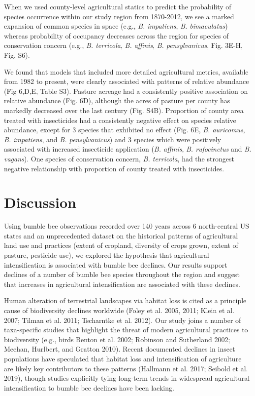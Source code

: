 \documentclass[11pt,]{article}
\begin{document}
When we used county-level agricultural statics to predict the
probability of species occurrence within our study region from
1870-2012, we see a marked expansion of common species in space (e.g.,
\emph{B. impatiens}, \emph{B. bimaculatus}) whereas probability of
occupancy decreases across the region for species of conservation
concern (e.g., \emph{B. terricola}, \emph{B. affinis}, \emph{B.
pensylvanicus}, Fig. 3E-H, Fig. S6).

We found that models that included more detailed agricultural metrics,
available from 1982 to present, were clearly associated with patterns of
relative abundance (Fig 6,D,E, Table S3). Pasture acreage had a
consistently positive association on relative abundance (Fig. 6D),
although the acres of pasture per county has markedly decreased over the
last century (Fig. S4B). Proportion of county area treated with
insecticides had a consistently negative effect on species relative
abundance, except for 3 species that exhibited no effect (Fig. 6E,
\emph{B. auricomus}, \emph{B. impatiens}, and \emph{B. pensylvanicus})
and 3 species which were positively associated with increased
insecticide application (\emph{B. affinis}, \emph{B. rufocinctus} and
\emph{B. vagans}). One species of conservation concern, \emph{B.
terricola}, had the strongest negative relationship with proportion of
county treated with insecticides.

\hypertarget{discussion}{%
\section{Discussion}\label{discussion}}

Using bumble bee observations recorded over 140 years across 6
north-central US states and an unprecedented dataset on the historical
patterns of agricultural land use and practices (extent of cropland,
diversity of crops grown, extent of pasture, pesticide use), we explored
the hypothesis that agricultural intensification is associated with
bumble bee declines. Our results support declines of a number of bumble
bee species throughout the region and suggest that increases in
agricultural intensification are associated with these declines.

Human alteration of terrestrial landscapes via habitat loss is cited as
a principle cause of biodiversity declines worldwide (Foley et al. 2005,
2011; Klein et al. 2007; Tilman et al. 2011; Tscharntke et al. 2012).
Our study joins a number of taxa-specific studies that highlight the
threat of modern agricultural practices to biodiversity (e.g., birds
Benton et al. 2002; Robinson and Sutherland 2002; Meehan, Hurlbert, and
Gratton 2010). Recent documented declines in insect populations have
speculated that habitat loss and intensification of agriculture are
likely key contributors to these patterns (Hallmann et al. 2017; Seibold
et al. 2019), though studies explicitly tying long-term trends in
widespread agricultural intensification to bumble bee declines have been
lacking.
\end{document}
